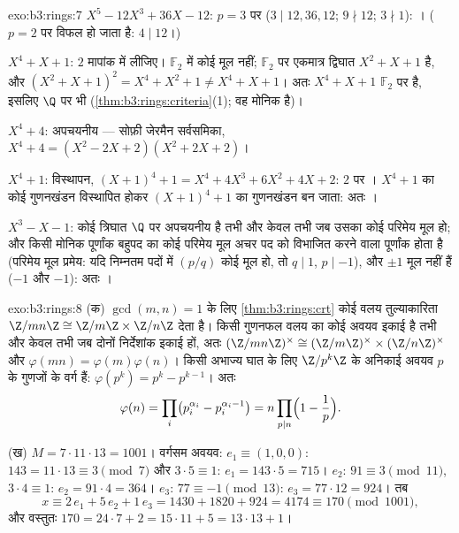 \begin{solution}{exo:b3:rings:7}
\emph{$X^5 - 12X^3 + 36X - 12$}: $p = 3$ पर  ($3 \mid
12, 36, 12$; $9 \nmid 12$; $3 \nmid 1$): ।
($p = 2$ पर  विफल हो जाता है: $4 \mid 12$।)

\emph{$X^4 + X + 1$}: $2$ मापांक में लीजिए। $\mathbb F_2$ में कोई मूल नहीं; $\mathbb F_2$
पर एकमात्र  द्विघात $X^2 + X +
1$ है, और $(X^2+X+1)^2 = X^4 + X^2 + 1 \neq X^4 + X + 1$। अतः $X^4 +
X + 1$ $\mathbb F_2$ पर
 है, इसलिए $\Q$ पर भी (\cref{thm:b3:rings:criteria}(1); वह मोनिक है)।

\emph{$X^4 + 4$}: अपचयनीय --- सोफ़ी जेरमैन सर्वसमिका, $X^4 + 4 = (X^2 - 2X + 2)(X^2 + 2X + 2)$।

\emph{$X^4 + 1$}: विस्थापन, $(X+1)^4 + 1 = X^4 + 4X^3 + 6X^2 + 4X +
2$: $2$ पर । $X^4+1$ का कोई
गुणनखंडन विस्थापित होकर $(X+1)^4 + 1$ का गुणनखंडन बन जाता: अतः ।

\emph{$X^3 - X - 1$}: कोई त्रिघात $\Q$ पर अपचयनीय है तभी और केवल तभी जब
उसका कोई परिमेय मूल हो; और किसी मोनिक पूर्णांक बहुपद का कोई परिमेय
मूल अचर पद को विभाजित करने वाला पूर्णांक होता है (परिमेय मूल प्रमेय:
यदि निम्नतम पदों में $(p/q)$ कोई मूल हो, तो $q \mid 1$, $p \mid -1$), और $\pm 1$
मूल नहीं हैं ($-1$ और $-1$): अतः ।
\end{solution}

\begin{solution}{exo:b3:rings:8}
(क) $\gcd(m, n) = 1$ के लिए \cref{thm:b3:rings:crt} कोई वलय तुल्याकारिता $\Z/mn\Z \cong \Z/m\Z \times \Z/n\Z$ देता है। किसी
गुणनफल वलय का कोई अवयव इकाई है तभी और केवल तभी जब दोनों निर्देशांक
इकाई हों, अतः
$(\Z/mn\Z)^\times \cong (\Z/m\Z)^\times \times (\Z/n\Z)^\times$
और $\varphi(mn) = \varphi(m)\varphi(n)$। किसी अभाज्य घात के लिए $\Z/p^k\Z$ के अनिकाई अवयव $p$ के
गुणजों के वर्ग हैं: $\varphi(p^k) = p^k - p^{k-1}$। अतः
\[
\varphi(n) = \prod_i \bigl(p_i^{\alpha_i} -
p_i^{\alpha_i-1}\bigr) = n \prod_{p \mid n}\Bigl(1 -
\frac1p\Bigr).
\]

(ख) $M = 7 \cdot 11 \cdot 13 = 1001$। वर्गसम अवयव: $e_1 \equiv
(1, 0, 0)$: $143 = 11\cdot13 \equiv 3 \pmod 7$ और $3 \cdot 5
\equiv 1$: $e_1 = 143 \cdot 5 = 715$। $e_2$: $91 \equiv 3
\pmod{11}$,
$3 \cdot 4 \equiv 1$: $e_2 = 91\cdot4 = 364$। $e_3$: $77 \equiv -1 \pmod{13}$: $e_3 = 77 \cdot 12 = 924$। तब
\[
x \equiv 2\,e_1 + 5\,e_2 + 1\,e_3 = 1430 + 1820 + 924 = 4174
\equiv 170 \pmod{1001},
\]
और वस्तुतः $170 = 24\cdot7 + 2 = 15\cdot11 + 5 = 13\cdot13 + 1$।
\end{solution}

